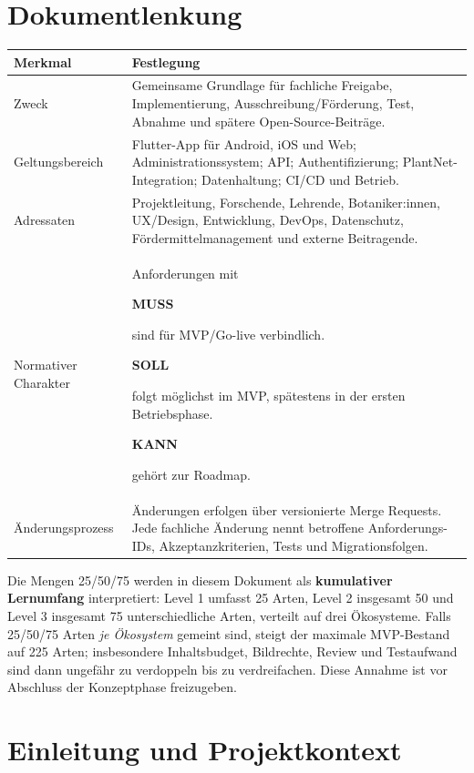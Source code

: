 \documentclass[10pt,a4paper,oneside]{article}
\newcommand{\TagMust}{\colorbox{MustBg}{\strut\textcolor{Forest}{\footnotesize\bfseries MUSS}}}
\newcommand{\TagShould}{\colorbox{ShouldBg}{\strut\textcolor{Bark}{\footnotesize\bfseries SOLL}}}
\newcommand{\TagCould}{\colorbox{CouldBg}{\strut\textcolor{Muted}{\footnotesize\bfseries KANN}}}
\begin{document}
\section*{Dokumentlenkung}

\begin{tabularx}{\textwidth}{@{}p{34mm}X@{}}
\toprule
\textbf{Merkmal} & \textbf{Festlegung} \\
\midrule
Zweck & Gemeinsame Grundlage für fachliche Freigabe, Implementierung, Ausschreibung/Förderung, Test, Abnahme und spätere Open-Source-Beiträge. \\
Geltungsbereich & Flutter-App für Android, iOS und Web; Administrationssystem; API; Authentifizierung; PlantNet-Integration; Datenhaltung; CI/CD und Betrieb. \\
Adressaten & Projektleitung, Forschende, Lehrende, Botaniker:innen, UX/Design, Entwicklung, DevOps, Datenschutz, Fördermittelmanagement und externe Beitragende. \\
Normativer Charakter & Anforderungen mit \TagMust{} sind für MVP/Go-live verbindlich. \TagShould{} folgt möglichst im MVP, spätestens in der ersten Betriebsphase. \TagCould{} gehört zur Roadmap. \\
Änderungsprozess & Änderungen erfolgen über versionierte Merge Requests. Jede fachliche Änderung nennt betroffene Anforderungs-IDs, Akzeptanzkriterien, Tests und Migrationsfolgen. \\
\bottomrule
\end{tabularx}

\begin{decisionbox}[title={\textbf{Offene Annahme A-01 -- Umfang der Pflanzenarten}}]
Die Mengen 25/50/75 werden in diesem Dokument als \textbf{kumulativer Lernumfang} interpretiert: Level 1 umfasst 25 Arten, Level 2 insgesamt 50 und Level 3 insgesamt 75 unterschiedliche Arten, verteilt auf drei Ökosysteme. Falls 25/50/75 Arten \emph{je Ökosystem} gemeint sind, steigt der maximale MVP-Bestand auf 225 Arten; insbesondere Inhaltsbudget, Bildrechte, Review und Testaufwand sind dann ungefähr zu verdoppeln bis zu verdreifachen. Diese Annahme ist vor Abschluss der Konzeptphase freizugeben.
\end{decisionbox}

\tableofcontents
\clearpage

\section{Einleitung und Projektkontext}
\end{document}
